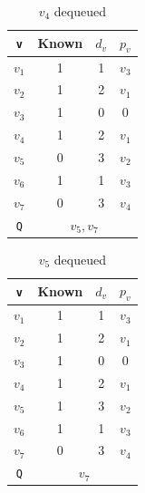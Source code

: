 \begin{minipage}{0.33\textwidth}
  \begin{table}[H]
    \centering
    \begin{tabular}{c|c|c|c}
        \toprule
        \verb|v| & Known & \(d_v\) & \(p_v\)  \\
      \midrule
        \(v_1\) & 1 & 1 & \(v_3\)  \\
        \(v_2\) & 1 & 2 & \(v_1\)  \\
        \(v_3\) & 1 & 0 & 0  \\
        \(v_4\) & 1 & 2 & \(v_1\)  \\
        \(v_5\) & 0 & 3 & \(v_2\)   \\
        \(v_6\) & 1 & 1 & \(v_3\)  \\
        \(v_7\) & 0 & 3 & \(v_4\)  \\
      \midrule
        \verb|Q| & \multicolumn{3}{c}{\(v_5, v_7\)} \\
      \bottomrule
    \end{tabular}
    \caption*{\(v_4\) dequeued}
  \end{table}
\end{minipage}
\begin{minipage}{0.33\textwidth}
  \begin{table}[H]
    \centering
    \begin{tabular}{c|c|c|c}
        \toprule
        \verb|v| & Known & \(d_v\) & \(p_v\)  \\
      \midrule
        \(v_1\) & 1 & 1 & \(v_3\)  \\
        \(v_2\) & 1 & 2 & \(v_1\)  \\
        \(v_3\) & 1 & 0 & 0  \\
        \(v_4\) & 1 & 2 & \(v_1\)  \\
        \(v_5\) & 1 & 3 & \(v_2\)   \\
        \(v_6\) & 1 & 1 & \(v_3\)  \\
        \(v_7\) & 0 & 3 & \(v_4\)  \\
      \midrule
        \verb|Q| & \multicolumn{3}{c}{\(v_7\)} \\
      \bottomrule
    \end{tabular}
    \caption*{\(v_5\) dequeued}
  \end{table}
\end{minipage}
